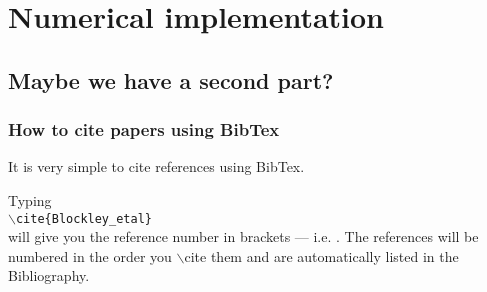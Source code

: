 \chapter{Numerical implementation}\label{Numerical implementation}

\section{Maybe we have a second part?}



\subsection{How to cite papers using BibTex}

It is very simple to cite references using BibTex.

Typing\\ {\tt $\backslash$cite\{Blockley\_etal\}}\\ will give you the reference number in brackets --- i.e. \cite{Blockley_etal}.
The references will be numbered in the order you $\backslash$cite them and are automatically listed 	in the Bibliography.
